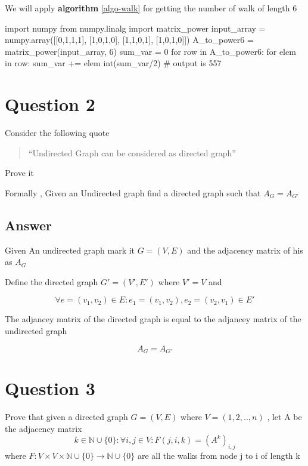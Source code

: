 \documentclass[9pt,twocolumn]{article}
\begin{document}
We will apply \textbf{algorithm} \ref{algo-walk}  for getting the number of walk of length 6

\label{calculate-walks}
\begin{python}
import numpy
from numpy.linalg import matrix_power
input_array = numpy.array([[0,1,1,1],
                           [1,0,1,0],
                           [1,1,0,1],
                           [1,0,1,0]])
A_to_power6 = matrix_power(input_array, 6)
sum_var = 0
for row in A_to_power6:
    for elem in row:
        sum_var += elem
int(sum_var/2)
# output is 557
\end{python}



\section*{Question 2}
\label{sec:org0109cf2}
Consider the following quote
\begin{quote}
``Undirected Graph can be considered as directed graph''
\end{quote}
Prove it

Formally , Given an Undirected graph find a directed graph such that \(A_G = A_{G'}\)


\subsection*{Answer}
\label{sec:org569c23f}
Given An undirected graph mark it \(G=(V,E)\) and the adjacency matrix of his as \(A_G\)

Define the directed graph \(G'=(V',E')\) where \(V'=V\) and

\[ \forall e=(v_1,v_2)\in E : e_1=(v_1,v_2) , e_2=(v_2,v_1)\in E'  \]

The adjancey matrix of the directed graph is equal to the adjancey matrix of the undirected graph

\[ A_G=A_{G'} \]


\section*{Question 3}
\label{sec:org8c1a469}
Prove that given a directed graph \(G=(V,E)\) where \(V=(1,2,..,n)\) , let A be the adjacency matrix
\[ k \in \mathbb{N}\cup{\{0\}}: \forall i,j\in V : F(j,i ,k)=(A^k)_{i,j} \]
where \(F:V \times V \times \mathbb{N}\cup{\{0\}} \rightarrow \mathbb{N}\cup{\{0\}}\)
are all the walks from node j to i of length k
\end{document}
